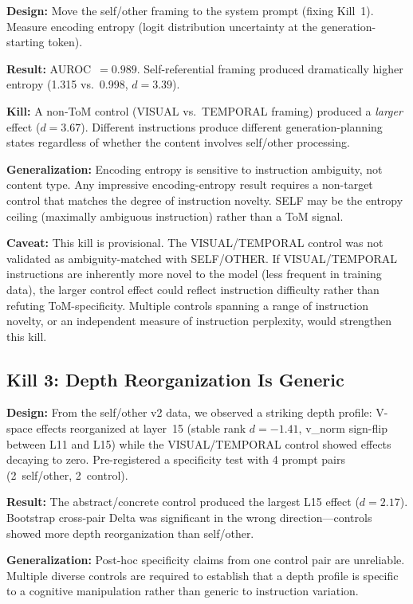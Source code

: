 \documentclass[11pt,a4paper]{article}
\begin{document}
\textbf{Design:} Move the self/other framing to the system prompt (fixing
Kill~1). Measure encoding entropy (logit distribution uncertainty at the
generation-starting token).

\textbf{Result:} AUROC~$= 0.989$. Self-referential framing produced
dramatically higher entropy (1.315 vs.\ 0.998, $d{=}3.39$).

\textbf{Kill:} A non-ToM control (VISUAL vs.\ TEMPORAL framing) produced a
\emph{larger} effect ($d{=}3.67$). Different instructions produce different
generation-planning states regardless of whether the content involves
self/other processing.

\textbf{Generalization:} Encoding entropy is sensitive to instruction
ambiguity, not content type. Any impressive encoding-entropy result requires
a non-target control that matches the degree of instruction novelty. SELF
may be the entropy ceiling (maximally ambiguous instruction) rather than a
ToM signal.

\textbf{Caveat:} This kill is provisional. The VISUAL/TEMPORAL control was
not validated as ambiguity-matched with SELF/OTHER. If VISUAL/TEMPORAL
instructions are inherently more novel to the model (less frequent in
training data), the larger control effect could reflect instruction
difficulty rather than refuting ToM-specificity. Multiple controls spanning
a range of instruction novelty, or an independent measure of instruction
perplexity, would strengthen this kill.

\subsection{Kill 3: Depth Reorganization Is Generic}
\label{sec:kill3}

\textbf{Design:} From the self/other v2 data, we observed a striking depth
profile: V-space effects reorganized at layer~15 (stable rank $d{=}{-}1.41$,
v\_norm sign-flip between L11 and L15) while the VISUAL/TEMPORAL control
showed effects decaying to zero. Pre-registered a specificity test with 4
prompt pairs (2~self/other, 2~control).

\textbf{Result:} The abstract/concrete control produced the largest L15
effect ($d{=}2.17$). Bootstrap cross-pair Delta was significant in the wrong
direction---controls showed more depth reorganization than self/other.

\textbf{Generalization:} Post-hoc specificity claims from one control pair
are unreliable. Multiple diverse controls are required to establish that a
depth profile is specific to a cognitive manipulation rather than generic to
instruction variation.
\end{document}
